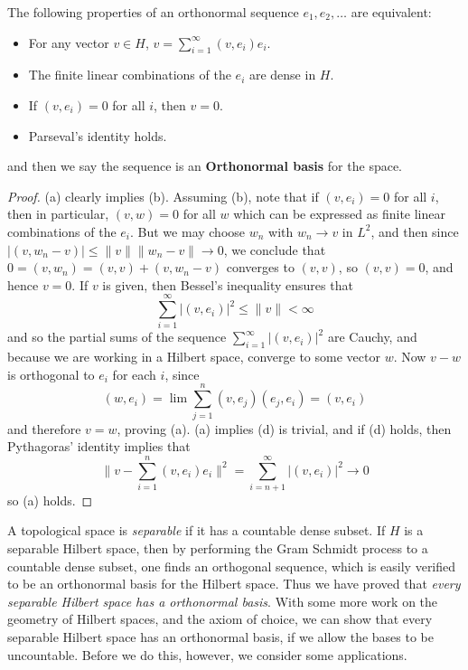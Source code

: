 \begin{theorem}
    The following properties of an orthonormal sequence $e_1, e_2, \dots$ are equivalent:
    \begin{itemize}
        \item[(a)] For any vector $v \in H$, $v = \sum_{i = 1}^\infty (v,e_i) e_i$.
        \item[(b)] The finite linear combinations of the $e_i$ are dense in $H$.
        \item[(c)] If $(v,e_i) = 0$ for all $i$, then $v = 0$.
        \item[(d)] Parseval's identity holds.
    \end{itemize}
    and then we say the sequence is an {\bf Orthonormal basis} for the space.
\end{theorem}
\begin{proof}
    (a) clearly implies (b). Assuming (b), note that if $(v,e_i) = 0$ for all $i$, then in particular, $(v,w) = 0$ for all $w$ which can be expressed as finite linear combinations of the $e_i$. But we may choose $w_n$ with $w_n \to v$ in $L^2$, and then since $|(v,w_n - v)| \leq \|v\|\|w_n - v\| \to 0$, we conclude that $0 = (v,w_n) = (v,v) + (v,w_n-v)$ converges to $(v,v)$, so $(v,v) = 0$, and hence $v = 0$. If $v$ is given, then Bessel's inequality ensures that
    \[ \sum_{i = 1}^\infty |(v,e_i)|^2 \leq \| v \| < \infty \]
    and so the partial sums of the sequence $\sum_{i = 1}^\infty |(v,e_i)|^2$ are Cauchy, and because we are working in a Hilbert space, converge to some vector $w$. Now $v - w$ is orthogonal to $e_i$ for each $i$, since
    \[ (w,e_i) = \lim \sum_{j = 1}^n (v,e_j)(e_j,e_i) = (v,e_i) \]
    and therefore $v = w$, proving (a). (a) implies (d) is trivial, and if (d) holds, then Pythagoras' identity implies that
    \[ \| v - \sum_{i = 1}^n (v,e_i) e_i \|^2 = \sum_{i = n+1}^\infty |(v,e_i)|^2 \to 0 \]
    so (a) holds.
\end{proof}

A topological space is {\it separable} if it has a countable dense subset. If $H$ is a separable Hilbert space, then by performing the Gram Schmidt process to a countable dense subset, one finds an orthogonal sequence, which is easily verified to be an orthonormal basis for the Hilbert space. Thus we have proved that {\it every separable Hilbert space has a orthonormal basis}. With some more work on the geometry of Hilbert spaces, and the axiom of choice, we can show that every separable Hilbert space has an orthonormal basis, if we allow the bases to be uncountable. Before we do this, however, we consider some applications.

